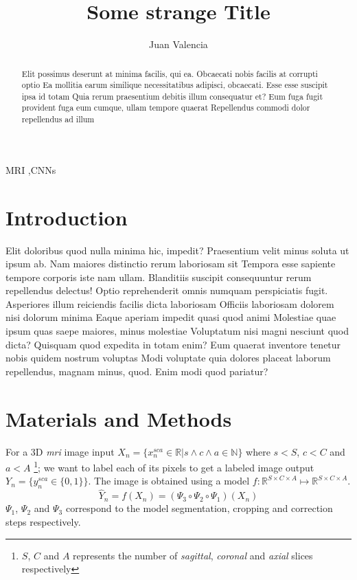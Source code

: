 \documentclass{elsarticle}
\author[1]{Juan Valencia}
\title{Some strange Title}
\begin{document}
\begin{keyword}
    MRI \sep CNNs
\end{keyword}
\begin{abstract}
    Elit possimus deserunt at minima facilis, qui ea. Obcaecati nobis facilis at
    corrupti optio Ea mollitia earum similique necessitatibus adipisci,
    obcaecati. Esse esse suscipit ipsa id totam Quia rerum praesentium debitis
    illum consequatur et? Eum fuga fugit provident fuga eum cumque, ullam
    tempore quaerat Repellendus commodi dolor repellendus ad illum
\end{abstract}
\maketitle
\section{Introduction}
Elit doloribus quod nulla minima hic, impedit? Praesentium velit minus soluta ut
ipsum ab. Nam maiores distinctio rerum laboriosam sit Tempora esse sapiente
tempore corporis iste nam ullam. Blanditiis suscipit consequuntur rerum
repellendus delectus! Optio reprehenderit omnis numquam perspiciatis fugit.
Asperiores illum reiciendis facilis dicta laboriosam Officiis laboriosam dolorem
nisi dolorum minima Eaque aperiam impedit quasi quod animi Molestiae quae ipsum
quas saepe maiores, minus molestiae Voluptatum nisi magni nesciunt quod dicta?
Quisquam quod expedita in totam enim? Eum quaerat inventore tenetur nobis quidem
nostrum voluptas Modi voluptate quia dolores placeat laborum repellendus, magnam
minus, quod. Enim modi quod pariatur?\par

\section{Materials and Methods}

For a 3D \emph{mri} image input $X_n = \{x_n^{s c a} \in \mathbb{R} | s \land c
\land a \in \mathbb{N}\}$ where  $s < S$, $c < C $ and $a < A$ \footnote{$S$,
$C$ and $A$ represents the number of \emph{sagittal}, \emph{coronal} and
\emph{axial} slices respectively};  we want to label each of its pixels to get a
labeled image output $Y_n = \{y_n^{sca} \in \{0, 1\}\}$. The image is obtained
using a model $f : \mathbb{R}^{S \times C \times A} \mapsto \mathbb{R}^{S \times
C \times A} $.
\begin{equation}
    \hat{Y}_n = f(X_n) = (\Psi_3 \circ \Psi_2 \circ \Psi_1) (X_n)
\end{equation}
$\Psi_1$, $\Psi_2$ and $\Psi_3$ correspond to the model segmentation, cropping
and correction steps respectively.\par
\end{document}
